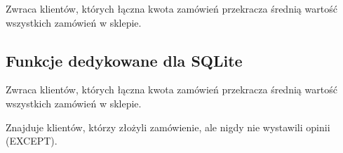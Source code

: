 \documentclass[letterpaper,10pt,polish]{sphinxmanual}
\begin{document}
\begin{fulllineitems}
\label{\detokenize{rozdzia_u0142_5/BD_Zapytania/index:db_queries.get_top_spending_clients_sqlite}}
\pysigstartsignatures
{}
\pysigstopsignatures
\sphinxAtStartPar
Zwraca klientów, których łączna kwota zamówień przekracza średnią wartość wszystkich zamówień w sklepie.

\end{fulllineitems}



\subsection{Funkcje dedykowane dla SQLite}
\label{\detokenize{rozdzia_u0142_5/BD_Zapytania/index:funkcje-dedykowane-dla-sqlite}}

\begin{fulllineitems}
\label{\detokenize{rozdzia_u0142_5/BD_Zapytania/index:id0}}
\pysigstartsignatures
{}
\pysigstopsignatures
\sphinxAtStartPar
Zwraca klientów, których łączna kwota zamówień przekracza średnią wartość wszystkich zamówień w sklepie.

\end{fulllineitems}


\begin{fulllineitems}
\label{\detokenize{rozdzia_u0142_5/BD_Zapytania/index:id1}}
\pysigstartsignatures
{}
\pysigstopsignatures
\sphinxAtStartPar
Znajduje klientów, którzy złożyli zamówienie, ale nigdy nie wystawili opinii (EXCEPT).

\end{fulllineitems}

\end{document}
